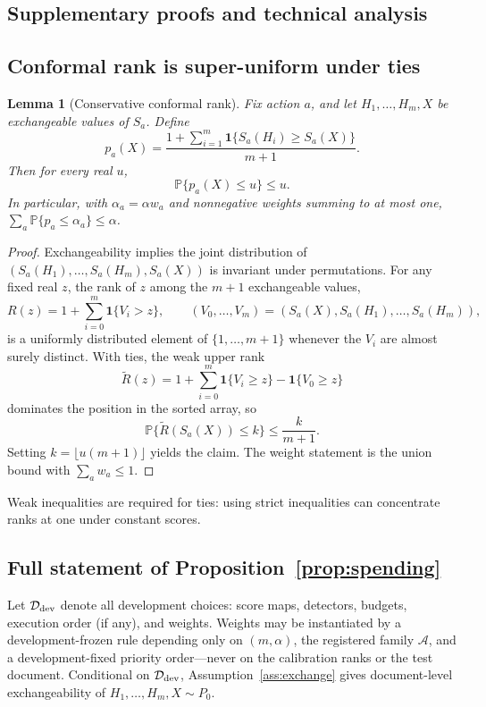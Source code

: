 \documentclass[pdflatex,sn-mathphys-num]{sn-jnl}
\newtheorem{lemma}{Lemma}[section]
\newcommand{\Prob}{\mathbb{P}}
\newcommand{\ind}{\mathbf{1}}
\newcommand{\calD}{\mathcal{D}}
\newcommand{\calA}{\mathcal{A}}
\begin{document}
\begin{appendices}
\renewcommand{\theHequation}{appendix.\Alph{section}.\arabic{equation}}
\section{Supplementary proofs and technical analysis}\label{app:proofs}

\subsection{Conformal rank is super-uniform under ties}

\begin{lemma}[Conservative conformal rank]\label{lem:rank}
Fix action \(a\), and let \(H_1,\ldots,H_m,X\) be exchangeable values of \(S_a\). Define
\[
 p_a(X)=\frac{1+\sum_{i=1}^{m}\ind\{S_a(H_i)\geq S_a(X)\}}{m+1}.
\]
Then for every real \(u\),
\[
 \Prob\{p_a(X)\leq u\}\leq u.
\]
In particular, with \(\alpha_a=\alpha w_a\) and nonnegative weights summing to at most one, \(\sum_a\Prob\{p_a\leq\alpha_a\}\leq\alpha\).
\end{lemma}
\begin{proof}
Exchangeability implies the joint distribution of \((S_a(H_1),\ldots,S_a(H_m),S_a(X))\) is invariant under permutations. For any fixed real \(z\), the rank of \(z\) among the \(m+1\) exchangeable values,
\[
 R(z)=1+\sum_{i=0}^{m}\ind\{V_i>z\},\qquad
 (V_0,\ldots,V_m)=(S_a(X),S_a(H_1),\ldots,S_a(H_m)),
\]
is a uniformly distributed element of \(\{1,\ldots,m+1\}\) whenever the \(V_i\) are almost surely distinct. With ties, the weak upper rank
\[
 \widetilde R(z)=1+\sum_{i=0}^{m}\ind\{V_i\geq z\}-\ind\{V_0\geq z\}
\]
dominates the position in the sorted array, so
\[
 \Prob\{\widetilde R(S_a(X))\leq k\}\leq \frac{k}{m+1}.
\]
Setting \(k=\lfloor u(m+1)\rfloor\) yields the claim. The weight statement is the union bound with \(\sum_a w_a\leq1\).
\end{proof}

Weak inequalities are required for ties: using strict inequalities can concentrate ranks at one under constant scores.

\subsection{Full statement of Proposition~\ref{prop:spending}}\label{app:registered}

Let \(\calD_{\rm dev}\) denote all development choices: score maps, detectors, budgets, execution order (if any), and weights. Weights may be instantiated by a development-frozen rule depending only on \((m,\alpha)\), the registered family \(\calA\), and a development-fixed priority order---never on the calibration ranks or the test document. Conditional on \(\calD_{\rm dev}\), Assumption~\ref{ass:exchange} gives document-level exchangeability of \(H_1,\ldots,H_m,X\sim P_0\).


\end{appendices}
\end{document}

